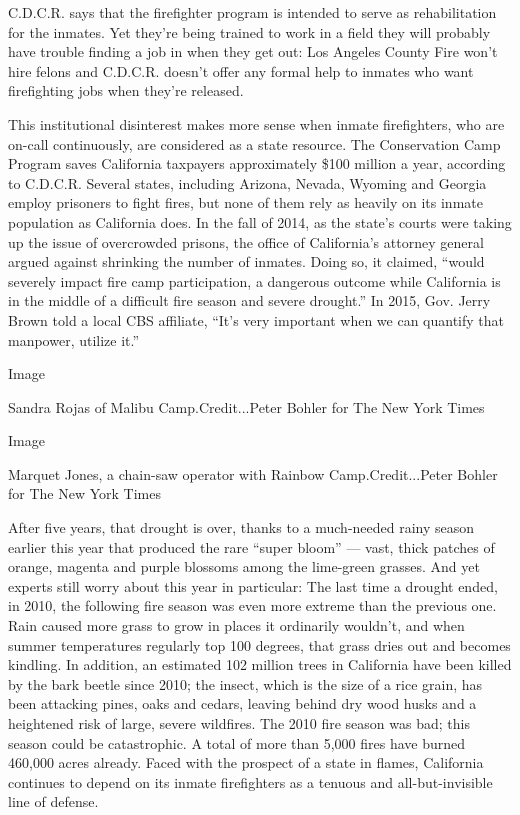 C.D.C.R. says that the firefighter program is intended to serve as
rehabilitation for the inmates. Yet they're being trained to work in a
field they will probably have trouble finding a job in when they get
out: Los Angeles County Fire won't hire felons and C.D.C.R. doesn't
offer any formal help to inmates who want firefighting jobs when they're
released.

This institutional disinterest makes more sense when inmate
firefighters, who are on-call continuously, are considered as a state
resource. The Conservation Camp Program saves California taxpayers
approximately \$100 million a year, according to C.D.C.R. Several
states, including Arizona, Nevada, Wyoming and Georgia employ prisoners
to fight fires, but none of them rely as heavily on its inmate
population as California does. In the fall of 2014, as the state's
courts were taking up the issue of overcrowded prisons, the office of
California's attorney general argued against shrinking the number of
inmates. Doing so, it claimed, ``would severely impact fire camp
participation, a dangerous outcome while California is in the middle of
a difficult fire season and severe drought.'' In 2015, Gov. Jerry Brown
told a local CBS affiliate, ``It's very important when we can quantify
that manpower, utilize it.''

Image

Sandra Rojas of Malibu Camp.Credit...Peter Bohler for The New York Times

Image

Marquet Jones, a chain-saw operator with Rainbow Camp.Credit...Peter
Bohler for The New York Times

After five years, that drought is over, thanks to a much-needed rainy
season earlier this year that produced the rare ``super bloom'' ---
vast, thick patches of orange, magenta and purple blossoms among the
lime-green grasses. And yet experts still worry about this year in
particular: The last time a drought ended, in 2010, the following fire
season was even more extreme than the previous one. Rain caused more
grass to grow in places it ordinarily wouldn't, and when summer
temperatures regularly top 100 degrees, that grass dries out and becomes
kindling. In addition, an estimated 102 million trees in California have
been killed by the bark beetle since 2010; the insect, which is the size
of a rice grain, has been attacking pines, oaks and cedars, leaving
behind dry wood husks and a heightened risk of large, severe wildfires.
The 2010 fire season was bad; this season could be catastrophic. A total
of more than 5,000 fires have burned 460,000 acres already. Faced with
the prospect of a state in flames, California continues to depend on its
inmate firefighters as a tenuous and all-but-invisible line of defense.

